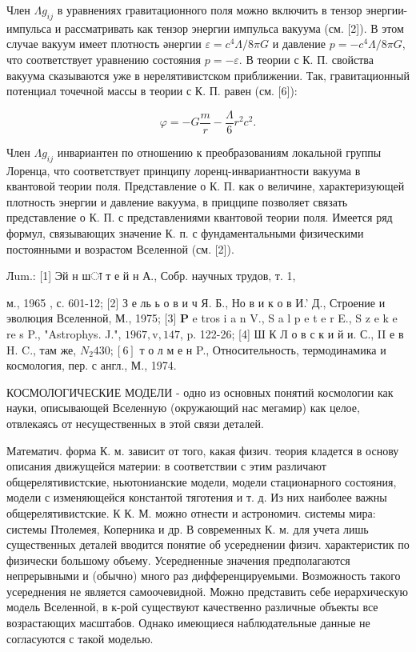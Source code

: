 \documentclass[10pt]{article}
\begin{document}
Член $\Lambda g_{i j}$ в уравнениях гравитационного поля можно включить в тензор энергии-импульса и рассматривать как тензор энергии импульса вакуума (см. [2]). В этом случае вакуум имеет плотность әнергии $\varepsilon=c^{4} \Lambda / 8 \pi G$ и давление $p=-c^{4} \Lambda / 8 \pi G$, что соответствует уравнению состояния $p=-\varepsilon$. В теории с К. П. свойства вакуума сказываются уже в нерелятивистском приближении. Так, гравитационный потенциал точечной массы в теории с К. П. равен (см. [6]):



\[

\varphi=-G \frac{m}{r}-\frac{\Lambda}{6} r^{2} c^{2} .

\]



Член $\Lambda g_{i j}$ инвариантен по отношению к преобразованиям локальной группы Лоренца, что соответствует принципу лоренц-инвариантности вакуума в квантовой теории поля. Представление о К. П. как о величине, характеризующей плотность энергии и давление вакуума, в прицципе позволяет связать представление о К. П. с представлениями квантовой теории поля. Имеется ряд формул, связывающих значение К. п. с фундаментальными физическими постоянными и возрастом Вселенной (см. [2]).



Лum.: [1] Эй н шा т е й н А., Собр. научных трудов, т. 1,

м., 1965 , с. 601-12; [2] З е ль ь о в и ч Я. Б., Но в и к о в И.' Д., Строение и эволюция Вселенной, М., 1975; [3] $\mathbf{P}$ e tros i a n V., S a l p e t e r E., S z e k e re s P., "Astrophys. J.", $1967, \mathrm{v}, 147$, p. 122-26; [4] Ш К Л о в с к и й и. С., II е в H. C., там же, $N_{2} 430 ;[6]$ т о л м е н P., Относительность, термодинамика и космология, пер. с англ., М., 1974.



КОСМОЛОГИЧЕСКИЕ МОДЕЛИ - одно из основных понятий космологии как науки, описывающей Вселенную (окружающий нас мегамир) как целое, отвлекаясь от несущественных в этой связи деталей.



Математич. форма К. м. зависит от того, какая физич. теория кладется в основу описания движущейся материи: в соответствии с этим различают общерелятивистские, ньютонианские модели, модели стационарного состояния, модели с изменяющейся константой тяготения и т. д. Из них наиболее важны общерелятивистские. К К. М. можно отнести и астрономич. системы мира: системы Птолемея, Коперника и др. В современных К. м. для учета лишь существенных деталей вводится понятие об усереднении физич. характеристик по физически большому объему. Усередненные значения предполагаются непрерывными и (обычно) много раз дифференцируемыми. Возможность такого усереднения не является самоочевидной. Можно представить себе иерархическую модель Вселенной, в к-рой существуют качественно различные объекты все возрастающих масштабов. Однако имеющиеся наблюдательные данные не согласуются с такой моделью.
\end{document}
